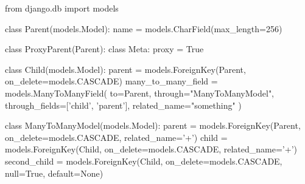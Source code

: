 {\begin{agentbox}
\begin{CodeVerbatim}[breaklines=true, breakanywhere=true]
from django.db import models

class Parent(models.Model):
    name = models.CharField(max_length=256)

class ProxyParent(Parent):
    class Meta:
        proxy = True

class Child(models.Model):
    parent = models.ForeignKey(Parent, on_delete=models.CASCADE)
    many_to_many_field = models.ManyToManyField(
        to=Parent,
        through="ManyToManyModel",
        through_fields=['child', 'parent'],
        related_name="something"
    )

class ManyToManyModel(models.Model):
    parent = models.ForeignKey(Parent, on_delete=models.CASCADE, related_name='+')
    child = models.ForeignKey(Child, on_delete=models.CASCADE, related_name='+')
    second_child = models.ForeignKey(Child, on_delete=models.CASCADE, null=True, default=None)


\end{CodeVerbatim}
\end{agentbox}}
